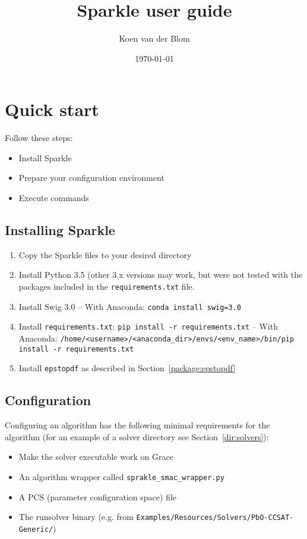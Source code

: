 \documentclass{article}
\title{Sparkle user guide}
\author{Koen van der Blom}
\date{\today}
\begin{document}
\maketitle

\section{Quick start}

Follow these steps:

\begin{itemize}
  \item[\ref{quick:install}] Install Sparkle
  \item[\ref{quick:config_environment}] Prepare your configuration environment
  \item[\ref{quick:execute_commands}] Execute commands
\end{itemize}

\subsection{Installing Sparkle}
\label{quick:install}

\begin{enumerate}
  \item Copy the Sparkle files to your desired directory
  \item Install Python 3.5 (other 3.x versions may work, but were not tested with the packages included in the \texttt{requirements.txt} file.
  \item Install Swig 3.0 -- With Anaconda: \texttt{conda install swig=3.0}
  \item Install \texttt{requirements.txt}: \texttt{pip install -r requirements.txt} -- With Anaconda: \texttt{/home/<username>/<anaconda\_dir>/envs/<env\_name>/bin/pip install -r requirements.txt}
  \item Install \texttt{epstopdf} as described in Section~\ref{package:epstopdf}
\end{enumerate}

\subsection{Configuration}
\label{quick:config_environment}

Configuring an algorithm has the following minimal requirements for the algorithm (for an example of a solver directory see Section~\ref{dir:solvers}):

\begin{itemize}
  \item[\ref{quick:solver_grace}] Make the solver executable work on Grace
  \item[\ref{quick:config_wrapper}] An algorithm wrapper called \texttt{sprakle\_smac\_wrapper.py}
  \item[\ref{quick:pcs_file}] A PCS (parameter configuration space) file
  \item The runsolver binary (e.g. from \texttt{Examples/Resources/Solvers/PbO-CCSAT-Generic/})
\end{itemize}
\end{document}
